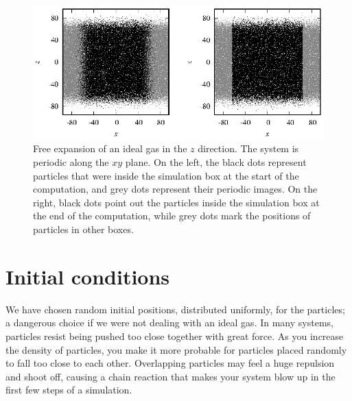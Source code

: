 \begin{figure}
  \includegraphics[width = \textwidth]{figures/free_expansion.eps}
  \caption{\label{free_expansion}Free expansion of an ideal gas in the $z$
           direction. The system is periodic along the $xy$ plane. On the left,
           the black dots represent particles that were inside the simulation
           box at the start of the computation, and grey dots represent their
           periodic images. On the right, black dots point out the particles
           inside the simulation box at the end of the computation, while grey
           dots mark the positions of particles in other boxes.}
\end{figure}

\section{Initial conditions}

We have chosen random initial positions, distributed uniformly, for the 
particles; a dangerous choice if we were not dealing with an ideal gas. In many 
systems, particles resist being pushed too close together with great force. As 
you increase the density of particles, you make it more probable for particles 
placed randomly to fall too close to each other. Overlapping particles may feel 
a huge repulsion and shoot off, causing a chain reaction that makes your system 
blow up in the first few steps of a simulation.

